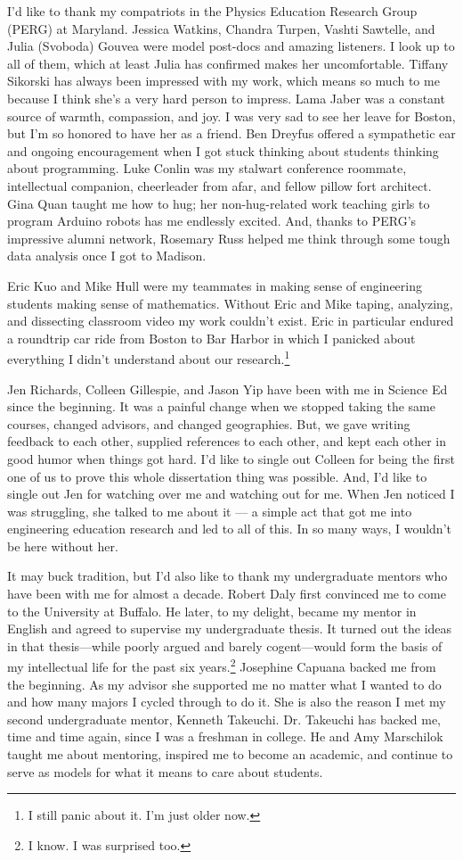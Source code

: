 I'd like to thank my compatriots in the Physics Education Research Group
(PERG) at Maryland. Jessica Watkins, Chandra Turpen, Vashti Sawtelle,
and Julia (Svoboda) Gouvea were model post-docs and amazing listeners. I
look up to all of them, which at least Julia has confirmed makes her
uncomfortable. Tiffany Sikorski has always been impressed with my work,
which means so much to me because I think she's a very hard person to
impress. Lama Jaber was a constant source of warmth, compassion, and
joy. I was very sad to see her leave for Boston, but I'm so honored to
have her as a friend. Ben Dreyfus offered a sympathetic ear and ongoing
encouragement when I got stuck thinking about students thinking about
programming. Luke Conlin was my stalwart conference roommate,
intellectual companion, cheerleader from afar, and fellow pillow fort
architect. Gina Quan taught me how to hug; her non-hug-related work
teaching girls to program Arduino robots has me endlessly excited. And,
thanks to PERG's impressive alumni network, Rosemary Russ helped me
think through some tough data analysis once I got to Madison.

Eric Kuo and Mike Hull were my teammates in making sense of engineering
students making sense of mathematics. Without Eric and Mike taping,
analyzing, and dissecting classroom video my work couldn't exist. Eric
in particular endured a roundtrip car ride from Boston to Bar Harbor in
which I panicked about everything I didn't understand about our
research.\footnote{I still panic about it. I'm just older now.}

Jen Richards, Colleen Gillespie, and Jason Yip have been with me in
Science Ed since the beginning. It was a painful change when we stopped
taking the same courses, changed advisors, and changed geographies. But,
we gave writing feedback to each other, supplied references to each
other, and kept each other in good humor when things got hard. I'd like
to single out Colleen for being the first one of us to prove this whole
dissertation thing was possible. And, I'd like to single out Jen for
watching over me and watching out for me. When Jen noticed I was
struggling, she talked to me about it --- a simple act that got me into
engineering education research and led to all of this. In so many ways,
I wouldn't be here without her.

It may buck tradition, but I'd also like to thank my undergraduate
mentors who have been with me for almost a decade. Robert Daly first
convinced me to come to the University at Buffalo. He later, to my
delight, became my mentor in English and agreed to supervise my
undergraduate thesis. It turned out the ideas in that thesis---while
poorly argued and barely cogent---would form the basis of my
intellectual life for the past six years.\footnote{I know. I was
  surprised too.} Josephine Capuana backed me from the beginning. As my
advisor she supported me no matter what I wanted to do and how many
majors I cycled through to do it. She is also the reason I met my second
undergraduate mentor, Kenneth Takeuchi. Dr. Takeuchi has backed me, time
and time again, since I was a freshman in college. He and Amy Marschilok
taught me about mentoring, inspired me to become an academic, and
continue to serve as models for what it means to care about students.


